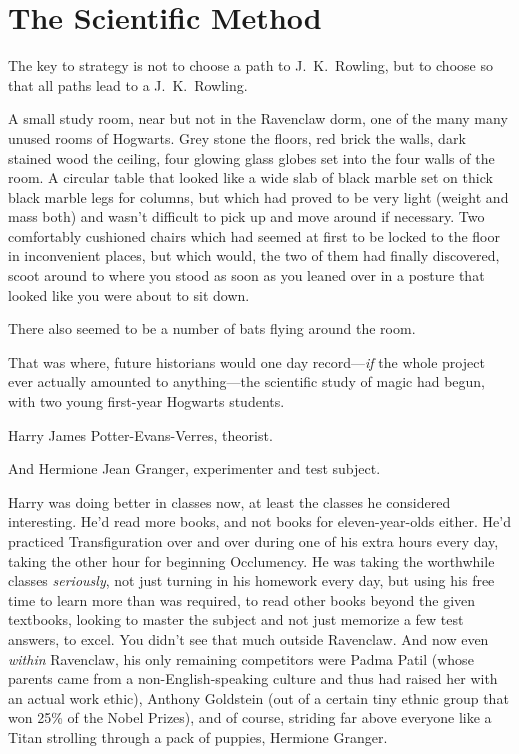 \chapter{The Scientific Method}

\begin{chapterOpeningAuthorNote}
The key to strategy is not to choose a path to J.~K.~Rowling, but to choose so that all paths lead to a J.~K.~Rowling.
\end{chapterOpeningAuthorNote}

\lettrine{A}{} small study room, near but not in the Ravenclaw dorm, one of the many many unused rooms of Hogwarts. Grey stone the floors, red brick the walls, dark stained wood the ceiling, four glowing glass globes set into the four walls of the room. A circular table that looked like a wide slab of black marble set on thick black marble legs for columns, but which had proved to be very light (weight and mass both) and wasn't difficult to pick up and move around if necessary. Two comfortably cushioned chairs which had seemed at first to be locked to the floor in inconvenient places, but which would, the two of them had finally discovered, scoot around to where you stood as soon as you leaned over in a posture that looked like you were about to sit down.

There also seemed to be a number of bats flying around the room.

That was where, future historians would one day record—\emph{if} the whole project ever actually amounted to anything—the scientific study of magic had begun, with two young first-year Hogwarts students.

Harry James Potter-Evans-Verres, theorist.

And Hermione Jean Granger, experimenter and test subject.

Harry was doing better in classes now, at least the classes he considered interesting. He'd read more books, and not books for eleven-year-olds either. He'd practiced Transfiguration over and over during one of his extra hours every day, taking the other hour for beginning Occlumency. He was taking the worthwhile classes \emph{seriously}, not just turning in his homework every day, but using his free time to learn more than was required, to read other books beyond the given textbooks, looking to master the subject and not just memorize a few test answers, to excel. You didn't see that much outside Ravenclaw. And now even \emph{within} Ravenclaw, his only remaining competitors were Padma Patil (whose parents came from a non-English-speaking culture and thus had raised her with an actual work ethic), Anthony Goldstein (out of a certain tiny ethnic group that won 25\% of the Nobel Prizes), and of course, striding far above everyone like a Titan strolling through a pack of puppies, Hermione Granger.

